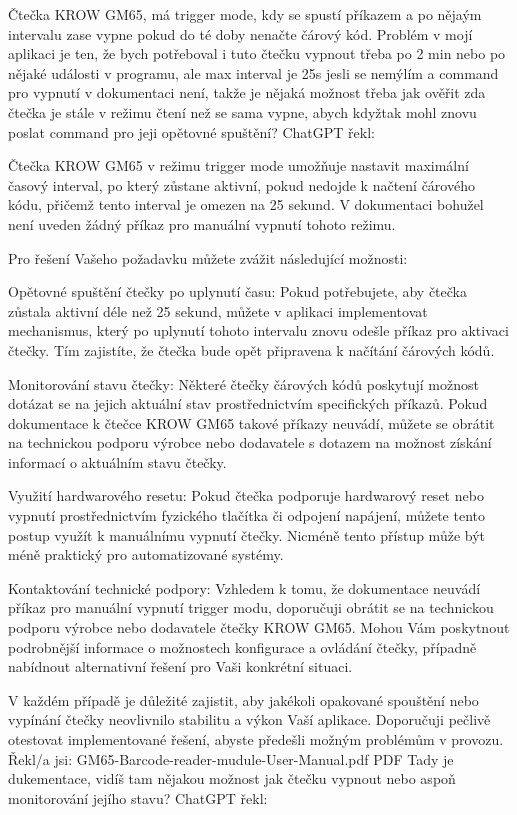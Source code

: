 Čtečka KROW GM65, má trigger mode, kdy se spustí příkazem a po nějaým intervalu zase vypne pokud do té doby nenačte čárový kód. Problém v mojí aplikaci je ten, že bych potřeboval i tuto čtečku vypnout třeba po 2 min nebo po nějaké události v programu, ale max interval je 25s jesli se nemýlím a command pro vypnutí v dokumentaci není, takže je nějaká možnost třeba jak ověřit zda čtečka je stále v režimu čtení než se sama vypne, abych kdyžtak mohl znovu poslat command pro jeji opětovné spuštění?
ChatGPT řekl:

​Čtečka KROW GM65 v režimu trigger mode umožňuje nastavit maximální časový interval, po který zůstane aktivní, pokud nedojde k načtení čárového kódu, přičemž tento interval je omezen na 25 sekund. V dokumentaci bohužel není uveden žádný příkaz pro manuální vypnutí tohoto režimu.​

Pro řešení Vašeho požadavku můžete zvážit následující možnosti:

    Opětovné spuštění čtečky po uplynutí času: Pokud potřebujete, aby čtečka zůstala aktivní déle než 25 sekund, můžete v aplikaci implementovat mechanismus, který po uplynutí tohoto intervalu znovu odešle příkaz pro aktivaci čtečky. Tím zajistíte, že čtečka bude opět připravena k načítání čárových kódů.​

    Monitorování stavu čtečky: Některé čtečky čárových kódů poskytují možnost dotázat se na jejich aktuální stav prostřednictvím specifických příkazů. Pokud dokumentace k čtečce KROW GM65 takové příkazy neuvádí, můžete se obrátit na technickou podporu výrobce nebo dodavatele s dotazem na možnost získání informací o aktuálním stavu čtečky.​

    Využití hardwarového resetu: Pokud čtečka podporuje hardwarový reset nebo vypnutí prostřednictvím fyzického tlačítka či odpojení napájení, můžete tento postup využít k manuálnímu vypnutí čtečky. Nicméně tento přístup může být méně praktický pro automatizované systémy.​

    Kontaktování technické podpory: Vzhledem k tomu, že dokumentace neuvádí příkaz pro manuální vypnutí trigger modu, doporučuji obrátit se na technickou podporu výrobce nebo dodavatele čtečky KROW GM65. Mohou Vám poskytnout podrobnější informace o možnostech konfigurace a ovládání čtečky, případně nabídnout alternativní řešení pro Vaši konkrétní situaci.​

V každém případě je důležité zajistit, aby jakékoli opakované spouštění nebo vypínání čtečky neovlivnilo stabilitu a výkon Vaší aplikace. Doporučuji pečlivě otestovat implementované řešení, abyste předešli možným problémům v provozu.​
Řekl/a jsi:
GM65-Barcode-reader-mudule-User-Manual.pdf
PDF
Tady je dukementace, vidíš tam nějakou možnost jak čtečku vypnout nebo aspoň monitorování jejího stavu?
ChatGPT řekl:

